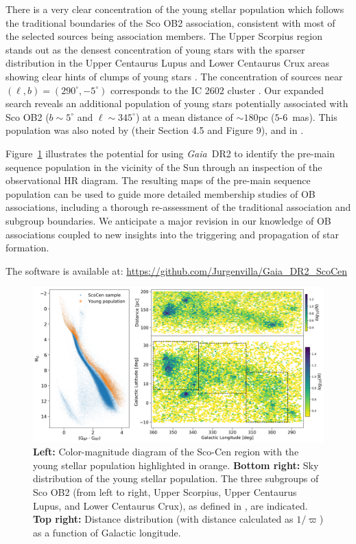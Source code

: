 \documentclass[RNAAS]{aastex62}
\newcommand\gaia{\textit{Gaia}}
\newcommand\gdr[1]{\gaia~DR#1}
\begin{document}
There is a very clear concentration of the young stellar population which follows the traditional boundaries of the Sco OB2 association, consistent with most of the selected sources being association members. The Upper Scorpius region stands out as the densest concentration of young stars with the sparser distribution in the Upper Centaurus Lupus and Lower Centaurus Crux areas showing clear hints of clumps of young stars \citep[indications of substructure were also found by][]{deZeeuw99}. The concentration of sources near $(\ell,b)=(290^\circ,-5^\circ)$ corresponds to the IC 2602 cluster \citep[$\varpi=6.74\pm0.25$~mas;][]{vanLeeuwen17}. Our expanded search reveals an additional population of young stars potentially associated with Sco OB2 ($b\sim5^\circ$ and $\ell\sim345^\circ$) at a mean distance of $\sim180\mathrm{pc}$ ($5$-$6$~mas). This population was also noted by \citet{deZeeuw99} (their Section 4.5 and Figure 9), and in \citet{Mamajek2016}.

Figure~\ref{fig:cmd} illustrates the potential for using \gdr{2} to identify the pre-main sequence population in the vicinity of the Sun through an inspection of the observational HR diagram. The resulting maps of the pre-main sequence population can be used to guide more detailed membership studies of OB associations, including a thorough re-assessment of the traditional association and subgroup boundaries. We anticipate a major revision in our knowledge of OB associations coupled to new insights into the triggering and propagation of star formation.

The software is available at: \url{https://github.com/Jurgenvilla/Gaia_DR2_ScoCen}

\begin{figure}
\begin{center}
\includegraphics[scale=0.48,angle=0]{ScoCen_Coordinates.png}
\caption{\textbf{Left:} Color-magnitude diagram of the Sco-Cen region with the young stellar population highlighted in orange. \textbf{Bottom right:} Sky distribution of the young stellar population. The three subgroups of Sco OB2 (from left to right, Upper Scorpius, Upper Centaurus Lupus, and Lower Centaurus Crux), as defined in \cite{deZeeuw99}, are indicated. \textbf{Top right:} Distance distribution (with distance calculated as $1/\varpi$) as a function of Galactic longitude.\label{fig:cmd}}
\end{center}
\end{figure}
\end{document}
